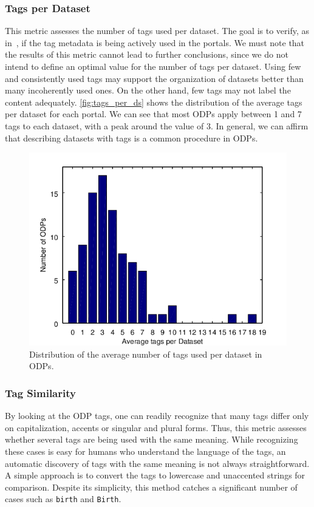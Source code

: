 \subsubsection{Tags per Dataset}
This metric assesses the number of tags used per dataset.
The goal is to verify, as in~, if the tag metadata is being actively used in the portals.
We must note that the results of this metric cannot lead to further conclusions, since we do not intend to define an optimal value for the number of tags per dataset. 
Using few and consistently used tags may support the organization of datasets better than many incoherently used ones.
On the other hand, few tags may not label the content adequately.
\autoref{fig:tags_per_ds} shows the distribution of the average tags per dataset for each portal. 
We can see that most ODPs apply between 1 and 7 tags to each dataset, with a peak around the value of 3.
In general, we can affirm that describing datasets with tags is a common procedure in ODPs.

\begin{figure}[tb]
\begin{center}
\includegraphics[width=\columnwidth]{images/tags_per_dataset.png}
\caption[Average number of tags per dataset.]{Distribution of the average number of tags used per dataset in ODPs.}
\label{fig:tags_per_ds}
\end{center}
\end{figure}

\subsubsection{Tag Similarity}
By looking at the ODP tags, one can readily recognize that many tags differ only on capitalization, accents or singular and plural forms.
Thus, this metric assesses whether several tags are being used with the same meaning.
While recognizing these cases is easy for humans who understand the language of the tags, an automatic discovery of tags with the same meaning is not always straightforward.
A simple approach is to convert the tags to lowercase and unaccented strings for comparison. 
Despite its simplicity, this method catches a significant number of cases such as \texttt{birth} and \texttt{Birth}.

